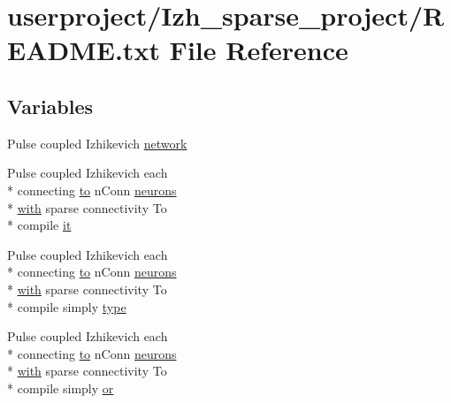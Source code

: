 \hypertarget{userproject_2Izh__sparse__project_2README_8txt}{\section{userproject/\+Izh\+\_\+sparse\+\_\+project/\+R\+E\+A\+D\+M\+E.txt File Reference}
\label{userproject_2Izh__sparse__project_2README_8txt}
}
\subsection*{Variables}
\begin{DoxyCompactItemize}
\item 
Pulse coupled Izhikevich \hyperlink{userproject_2Izh__sparse__project_2README_8txt_a3b32176ef4eb1068d5341ffeb475ff7d}{network}
\item 
Pulse coupled Izhikevich each \\*
connecting \hyperlink{README_8txt_add1f2ee32acc15ef77f839d4382c9768}{to} n\+Conn \hyperlink{userproject_2SynDelay__project_2README_8txt_a70f8ce34c10b15b6e0f669ff7bb2f696}{neurons} \\*
\hyperlink{userproject_2OneComp__project_2README_8txt_ace09bb40fbf4457ad9a9340a67a4fa9a}{with} sparse connectivity To \\*
compile \hyperlink{userproject_2Izh__sparse__project_2README_8txt_a5b3a17f50f267ab4d57ac6b074e618d1}{it}
\item 
Pulse coupled Izhikevich each \\*
connecting \hyperlink{README_8txt_add1f2ee32acc15ef77f839d4382c9768}{to} n\+Conn \hyperlink{userproject_2SynDelay__project_2README_8txt_a70f8ce34c10b15b6e0f669ff7bb2f696}{neurons} \\*
\hyperlink{userproject_2OneComp__project_2README_8txt_ace09bb40fbf4457ad9a9340a67a4fa9a}{with} sparse connectivity To \\*
compile simply \hyperlink{userproject_2Izh__sparse__project_2README_8txt_ab03a006b66263de6d1b21b1069fe61a1}{type}
\item 
Pulse coupled Izhikevich each \\*
connecting \hyperlink{README_8txt_add1f2ee32acc15ef77f839d4382c9768}{to} n\+Conn \hyperlink{userproject_2SynDelay__project_2README_8txt_a70f8ce34c10b15b6e0f669ff7bb2f696}{neurons} \\*
\hyperlink{userproject_2OneComp__project_2README_8txt_ace09bb40fbf4457ad9a9340a67a4fa9a}{with} sparse connectivity To \\*
compile simply \hyperlink{userproject_2Izh__sparse__project_2README_8txt_a30f1f0869188bba5db0cb6db428730f1}{or}
\end{DoxyCompactItemize}


